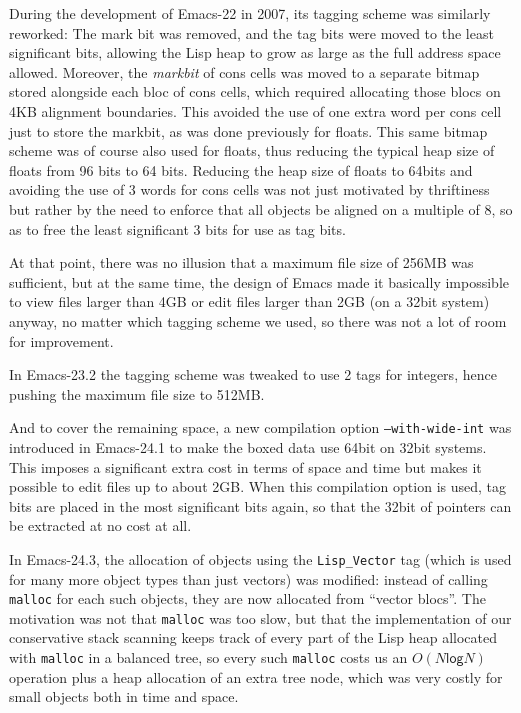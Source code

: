 \documentclass[format=acmsmall, review=false, screen=true]{acmart}
\begin{document}
During the development of Emacs-22 in 2007, its tagging scheme was
similarly reworked: The mark bit was removed, and the tag bits were
moved to the least significant bits, allowing the Lisp heap to grow as
large as the full address space allowed.
Moreover, the \emph{markbit} of cons cells was moved to a separate bitmap
stored alongside each bloc of cons cells, which required allocating those
blocs on 4KB alignment boundaries.  This avoided the use of one extra word
per cons cell just to store the markbit, as was done previously for floats.
This same bitmap scheme
was of course also used for floats, thus reducing the typical heap size of
floats from 96 bits to 64 bits.  Reducing the heap size of floats to 64bits
and avoiding the use of 3 words for cons cells was not just motivated by
thriftiness but rather by the need to enforce that all objects be aligned on
a multiple of 8, so as to free the least significant 3 bits for use as
tag bits.

At that point, there was no illusion that a maximum file size of 256MB was
sufficient, but at the same time, the design of Emacs made it basically
impossible to view files larger than 4GB or edit files larger than 2GB (on
a 32bit system) anyway, no matter which tagging scheme we used, so there was
not a lot of room for improvement.

In Emacs-23.2 the tagging scheme was tweaked to use 2 tags for integers,
hence pushing the maximum file size to 512MB.

And to cover the remaining space, a new compilation option
\texttt{--with-wide-int} was introduced in Emacs-24.1 to make the boxed data
use 64bit on 32bit systems.  This imposes a significant extra cost in terms
of space and time but makes it possible to edit files up to about 2GB.
When this compilation option is used, tag bits are placed in the most
significant bits again, so that the 32bit of pointers can be extracted at no
cost at all.


In Emacs-24.3, the allocation of objects using the \texttt{Lisp\_Vector} tag
(which is used for many more object types than just vectors) was modified:
instead of calling \texttt{malloc} for each such objects, they are now
allocated from ``vector blocs''.  The motivation was not that
\texttt{malloc} was too slow, but that the implementation of our
conservative stack scanning keeps track of every part of the Lisp heap
allocated with \texttt{malloc} in a balanced tree, so every such
\texttt{malloc} costs us an $O(N \textsf{log} N)$ operation plus a heap
allocation of an extra tree node, which was very costly for small objects
both in time and space.
\end{document}

